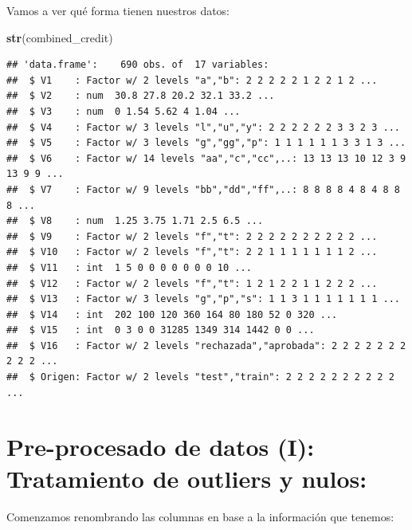 \documentclass[
]{article}
\newenvironment{Shaded}{\begin{snugshade}}{\end{snugshade}}
\newcommand{\FunctionTok}[1]{\textcolor[rgb]{0.13,0.29,0.53}{\textbf{#1}}}
\newcommand{\NormalTok}[1]{#1}
\begin{document}
Vamos a ver qué forma tienen nuestros datos:

\begin{Shaded}
\begin{Highlighting}[]
\FunctionTok{str}\NormalTok{(combined\_credit)}
\end{Highlighting}
\end{Shaded}

\begin{verbatim}
## 'data.frame':    690 obs. of  17 variables:
##  $ V1    : Factor w/ 2 levels "a","b": 2 2 2 2 2 1 2 2 1 2 ...
##  $ V2    : num  30.8 27.8 20.2 32.1 33.2 ...
##  $ V3    : num  0 1.54 5.62 4 1.04 ...
##  $ V4    : Factor w/ 3 levels "l","u","y": 2 2 2 2 2 2 3 3 2 3 ...
##  $ V5    : Factor w/ 3 levels "g","gg","p": 1 1 1 1 1 1 3 3 1 3 ...
##  $ V6    : Factor w/ 14 levels "aa","c","cc",..: 13 13 13 10 12 3 9 13 9 9 ...
##  $ V7    : Factor w/ 9 levels "bb","dd","ff",..: 8 8 8 8 4 8 4 8 8 8 ...
##  $ V8    : num  1.25 3.75 1.71 2.5 6.5 ...
##  $ V9    : Factor w/ 2 levels "f","t": 2 2 2 2 2 2 2 2 2 2 ...
##  $ V10   : Factor w/ 2 levels "f","t": 2 2 1 1 1 1 1 1 1 2 ...
##  $ V11   : int  1 5 0 0 0 0 0 0 0 10 ...
##  $ V12   : Factor w/ 2 levels "f","t": 1 2 1 2 2 1 1 2 2 2 ...
##  $ V13   : Factor w/ 3 levels "g","p","s": 1 1 3 1 1 1 1 1 1 1 ...
##  $ V14   : int  202 100 120 360 164 80 180 52 0 320 ...
##  $ V15   : int  0 3 0 0 31285 1349 314 1442 0 0 ...
##  $ V16   : Factor w/ 2 levels "rechazada","aprobada": 2 2 2 2 2 2 2 2 2 2 ...
##  $ Origen: Factor w/ 2 levels "test","train": 2 2 2 2 2 2 2 2 2 2 ...
\end{verbatim}

\hypertarget{pre-procesado-de-datos-i-tratamiento-de-outliers-y-nulos}{%
\section{Pre-procesado de datos (I): Tratamiento de outliers y
nulos:}\label{pre-procesado-de-datos-i-tratamiento-de-outliers-y-nulos}}

Comenzamos renombrando las columnas en base a la información que
tenemos:
\end{document}
